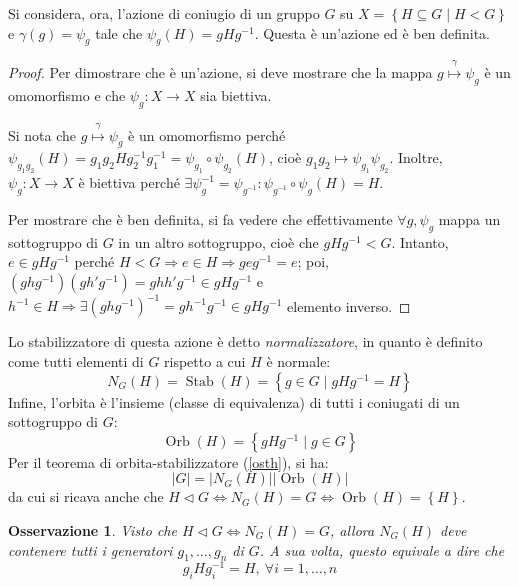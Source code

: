 \documentclass[12pt]{scrartcl}
\theoremstyle{style}
\newtheorem{osservazione}{Osservazione}[section]
\numberwithin{equation}{subsection}
\begin{document}
\noindent Si considera, ora, l'azione di coniugio di un gruppo $G$ su $X = \left\{ H \subseteq G  \mid H< G \right\} $ e $\gamma(g) = \psi _g$ tale che $\psi_g (H) = gH g^{-1} $. 
Questa \`e un'azione ed \`e ben definita.
\begin{proof}
	Per dimostrare che \`e un'azione, si deve mostrare che la mappa $g \stackrel{\gamma}{\mapsto} \psi _g$ \`e un omomorfismo e che $\psi _g : X \to X$ sia biettiva.

	Si nota che $g \stackrel{\gamma}{\mapsto} \psi _g$ \`e un omomorfismo perch\'e $\psi _{g_1g_2} (H) = g_1g_2Hg_2^{-1}g_1^{-1} = \psi _{g_1} \circ \psi _{g_2} (H)$, cio\`e $g_1g_2\mapsto \psi _{g_1} \psi _{g_2} $.
	Inoltre, $\psi _g:X\to X$ \`e biettiva perch\'e $\exists \psi ^{-1} _g = \psi _{g^{-1}} : \psi _{g^{-1}} \circ \psi _g (H) = H $.

	Per mostrare che \`e ben definita, si fa vedere che effettivamente $\forall g, \psi_g$ mappa un sottogruppo di $G$ in un altro sottogruppo, cio\`e che $gHg^{-1} < G$.
	Intanto, $e \in gHg^{-1} $ perch\'e $H < G \Rightarrow  e \in H \Rightarrow geg^{-1}=e$; poi, $(ghg^{-1})(gh'g^{-1}) = ghh'g^{-1} \in g H g ^{-1}$ e $h^{-1} \in H \Rightarrow \exists (ghg^{-1} )^{-1} = g h^{-1}g^{-1}\in gHg^{-1}$ elemento inverso.
\end{proof}
\noindent Lo stabilizzatore di questa azione \`e detto \textit{normalizzatore}, in quanto \`e definito come tutti elementi di $G$ rispetto a cui $H$ \`e normale: 
\begin{equation}
	N_G(H) = \operatorname{Stab} (H) = \left\{ g \in G  \mid g H g^{-1}= H \right\} 
\end{equation}
Infine, l'orbita \`e l'insieme (classe di equivalenza) di tutti i coniugati di un sottogruppo di $G$:
\begin{equation}
\operatorname{Orb} (H) = \left\{ gHg^{-1}  \mid  g \in G \right\} 
\end{equation}
Per il teorema di orbita-stabilizzatore (\ref{osth}), si ha:
\begin{equation}
	\lvert G \rvert  = \lvert N_G(H) \rvert \lvert \operatorname{Orb} (H) \rvert 
\end{equation}
da cui si ricava anche che $H \lhd G \iff N_G(H) = G \iff \operatorname{Orb} (H) = \left\{ H \right\} $.
\begin{osservazione}
Visto che $H \lhd G \iff N_G(H) = G$, allora $N_G(H)$ deve contenere tutti i generatori $g_1,\ldots,g_n$ di $G$.
A sua volta, questo equivale a dire che 
\[
g_i H g_i^{-1} = H , \ \forall i=1,\ldots,n
\] 
\end{osservazione}
\end{document}

